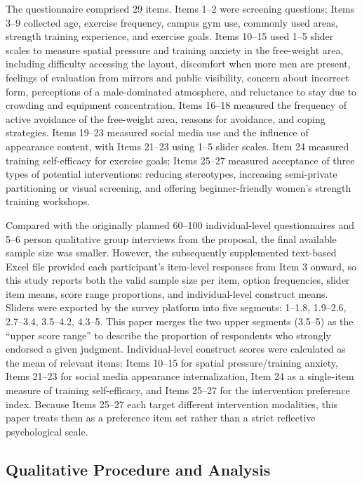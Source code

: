 The questionnaire comprised 29 items.
Items 1--2 were screening questions; Items 3--9 collected age, exercise frequency, campus gym use, commonly used areas, strength training experience, and exercise goals.
Items 10--15 used 1--5 slider scales to measure spatial pressure and training anxiety in the free-weight area, including difficulty accessing the layout, discomfort when more men are present, feelings of evaluation from mirrors and public visibility, concern about incorrect form, perceptions of a male-dominated atmosphere, and reluctance to stay due to crowding and equipment concentration.
Items 16--18 measured the frequency of active avoidance of the free-weight area, reasons for avoidance, and coping strategies.
Items 19--23 measured social media use and the influence of appearance content, with Items 21--23 using 1--5 slider scales.
Item 24 measured training self-efficacy for exercise goals; Items 25--27 measured acceptance of three types of potential interventions: reducing stereotypes, increasing semi-private partitioning or visual screening, and offering beginner-friendly women's strength training workshops.

Compared with the originally planned 60--100 individual-level questionnaires and 5--6 person qualitative group interviews from the proposal, the final available sample size was smaller.
However, the subsequently supplemented text-based Excel file provided each participant's item-level responses from Item 3 onward, so this study reports both the valid sample size per item, option frequencies, slider item means, score range proportions, and individual-level construct means.
Sliders were exported by the survey platform into five segments: 1--1.8, 1.9--2.6, 2.7--3.4, 3.5--4.2, 4.3--5.
This paper merges the two upper segments (3.5--5) as the ``upper score range'' to describe the proportion of respondents who strongly endorsed a given judgment.
Individual-level construct scores were calculated as the mean of relevant items: Items 10--15 for spatial pressure/training anxiety, Items 21--23 for social media appearance internalization, Item 24 as a single-item measure of training self-efficacy, and Items 25--27 for the intervention preference index.
Because Items 25--27 each target different intervention modalities, this paper treats them as a preference item set rather than a strict reflective psychological scale.

\subsection{Qualitative Procedure and Analysis}

